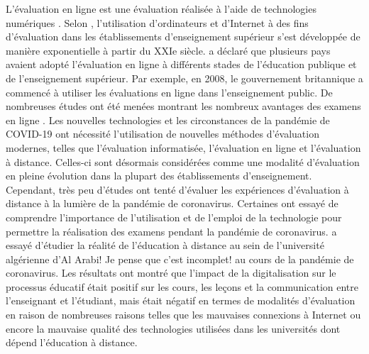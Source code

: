 \documentclass[french]{textolivre}
\begin{document}
L'évaluation en ligne est une évaluation réalisée à l'aide de technologies numériques \cite{eltahir_perspective_2019}. Selon \textcite{akdemir_computer-based_2008}, l'utilisation d’ordinateurs et d'Internet à des fins d'évaluation dans les établissements d'enseignement supérieur s'est développée de manière exponentielle à partir du XXIe siècle. \textcite{nugent2003line} a déclaré que plusieurs pays avaient adopté l'évaluation en ligne à différents stades de l'éducation publique et de l'enseignement supérieur. Par exemple, en 2008, le gouvernement britannique a commencé à utiliser les évaluations en ligne dans l'enseignement public. De nombreuses études ont été menées montrant les nombreux avantages des examens en ligne \cite{nguyen_examining_2017}. Les nouvelles technologies et les circonstances de la pandémie de COVID-19 ont nécessité l'utilisation de nouvelles méthodes d'évaluation modernes, telles que l'évaluation informatisée, l'évaluation en ligne et l'évaluation à distance. Celles-ci sont désormais considérées comme une modalité d’évaluation en pleine évolution dans la plupart des établissements d'enseignement. Cependant, très peu d'études ont tenté d'évaluer les expériences d'évaluation à distance à la lumière de la pandémie de coronavirus. Certaines ont essayé de comprendre l'importance de l'utilisation et de l'emploi de la technologie pour permettre la réalisation des examens pendant la pandémie de coronavirus. \textcite{safil2020} a essayé d’étudier la réalité de l'éducation à distance au sein de l'université algérienne d’Al Arabi! Je pense que c’est incomplet! au cours de la pandémie de coronavirus. Les résultats ont montré que l'impact de la digitalisation sur le processus éducatif était positif sur les cours, les leçons et la communication entre l'enseignant et l’étudiant, mais était négatif en termes de modalités d'évaluation en raison de nombreuses raisons telles que les mauvaises connexions à Internet ou encore la mauvaise qualité des technologies utilisées dans les universités dont dépend l'éducation à distance.
\end{document}
